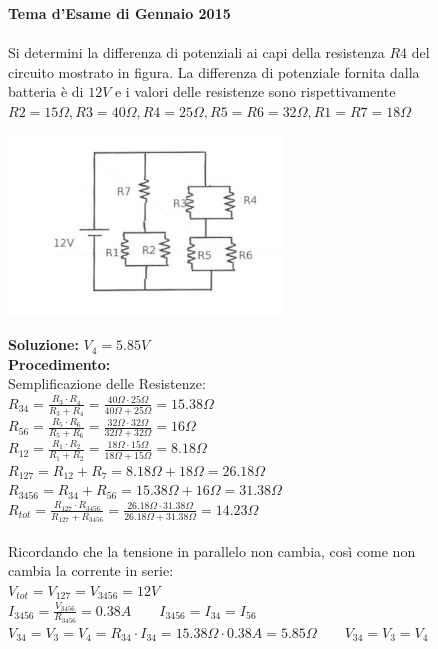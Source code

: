 \begin{figure}[h!]
\textbf{Tema d'Esame di Gennaio 2015}\\ \\
Si determini la differenza di potenziali ai capi della resistenza $R4$ del circuito mostrato in figura. La differenza di potenziale fornita dalla batteria è di $12V$ e i valori delle resistenze sono rispettivamente $R2=15\Omega, R3=40\Omega, R4=25\Omega, R5=R6=32\Omega, R1=R7=18\Omega$
\begin{center}
		\includegraphics[scale=1.2]{ES5/GEN052015.jpg}
	\end{center}
	\begin{boxed}
		\null\hfill \textbf{Soluzione:} $V_4 = 5.85 V$\\
		\textbf{Procedimento: } \\
		Semplificazione delle Resistenze:\\
		$R_{34}=\frac{R_3\cdot R_4}{R_3+R_4}=\frac{40\Omega \cdot 25\Omega}{40\Omega+25\Omega}=15.38\Omega$\\
		$R_{56}=\frac{R_5\cdot R_6}{R_5+R_6}=\frac{32\Omega \cdot 32\Omega}{32\Omega+32\Omega}=16\Omega$\\
		$R_{12}=\frac{R_1\cdot R_2}{R_1+R_2}=\frac{18\Omega \cdot 15\Omega}{18\Omega+15\Omega}=8.18\Omega$\\
		$R_{127}=R_{12}+R_7=8.18\Omega + 18\Omega=26.18\Omega$\\
		$R_{3456}=R_{34}+R_{56}=15.38\Omega+16\Omega=31.38\Omega$\\
		$R_{tot}=\frac{R_{127}\cdot R_{3456}}{R_{127}+R_{3456}}=\frac{26.18\Omega \cdot 31.38\Omega}{26.18\Omega + 31.38\Omega}=14.23\Omega$\\ \\
		Ricordando che la tensione in parallelo non cambia, così come non cambia la corrente in serie:\\
		$V_{tot}=V_{127}=V_{3456}=12V$\\
		$I_{3456}=\frac{V_{3456}}{R_{3456}}=0.38A \qquad I_{3456}=I_{34}=I_{56}$\\
		$V_{34}=V_3=V_4=R_{34}\cdot I_{34}=15.38\Omega \cdot 0.38A=5.85\Omega \qquad V_{34}=V_3=V_4$
	\end{boxed}
\end{figure}

